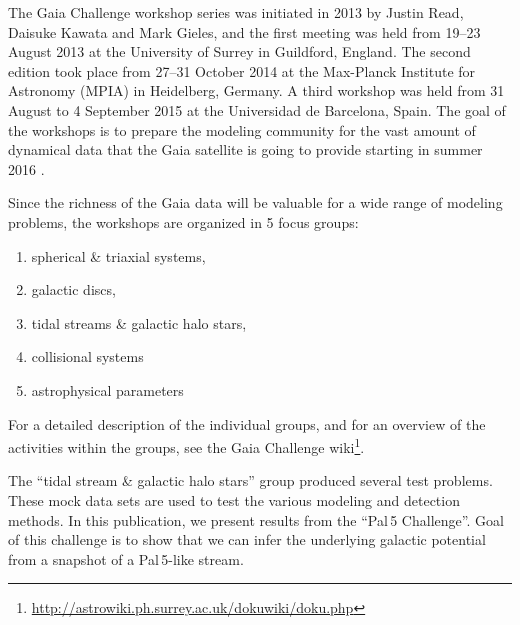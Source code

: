 The Gaia Challenge workshop series was initiated in 2013 by Justin Read, Daisuke Kawata and Mark Gieles, and the first meeting was held from 19--23 August 2013 at the University of Surrey in Guildford, England. 
The second edition took place from 27--31 October 2014 at the Max-Planck Institute for Astronomy (MPIA) in Heidelberg, Germany. 
A third workshop was held from 31 August to 4 September 2015 at the Universidad de Barcelona, Spain.
The goal of the workshops is to prepare the modeling community for the vast amount of dynamical data that the Gaia satellite is going to provide starting in summer 2016 \citep{Perryman01}.

Since the richness of the Gaia data will be valuable for a wide range of modeling problems, the workshops are organized in 5 focus groups:
\begin{enumerate}
\item spherical \& triaxial systems,
\item galactic discs,
\item tidal streams \& galactic halo stars,
\item collisional systems
\item astrophysical parameters 
\end{enumerate}
For a detailed description of the individual groups, and for an overview of the activities within the groups, see the Gaia Challenge wiki\footnote{\url{http://astrowiki.ph.surrey.ac.uk/dokuwiki/doku.php}}.

The ``tidal stream \& galactic halo stars'' group produced several test problems. These mock data sets are used to test the various modeling and detection methods. In this publication, we present results from the ``Pal\,5 Challenge''. Goal of this challenge is to show that we can infer the underlying galactic potential from a snapshot of a Pal\,5-like stream.